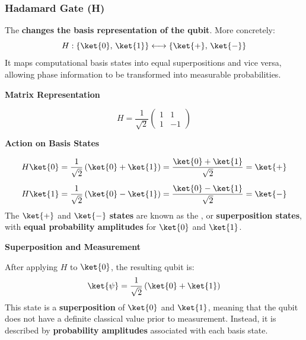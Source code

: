 \subsubsection{Hadamard Gate (H)}\label{subsubsec:hadamard-gate-h}

The  \textbf{changes the basis representation of the qubit}. More concretely:
\begin{equation*}
    H : \left\{ \ket{0}, \, \ket{1}\right\} \longleftrightarrow \left\{ \ket{+}, \, \ket{-}\right\}
\end{equation*}
It maps computational basis states into equal superpositions and vice versa, allowing phase information to be transformed into measurable probabilities.

\highspace
\begin{flushleft}
    \textcolor{Green3}{ \textbf{Matrix Representation}}
\end{flushleft}
\begin{equation}
    H = \dfrac{1}{\sqrt{2}} 
    \begin{pmatrix}
        1 & 1 \\ 1 & -1
    \end{pmatrix}
\end{equation}

\highspace
\begin{flushleft}
    \textcolor{Green3}{ \textbf{Action on Basis States}}
\end{flushleft}
\begin{align}\label{eq:hadamard-action-on-basis-states}
    H \ket{0} &= \dfrac{1}{\sqrt{2}}\left(\ket{0} + \ket{1}\right) = \dfrac{\ket{0} + \ket{1}}{\sqrt{2}} = \ket{+} \\[.5em]
    H \ket{1} &= \dfrac{1}{\sqrt{2}}\left(\ket{0} - \ket{1}\right) = \dfrac{\ket{0} - \ket{1}}{\sqrt{2}} = \ket{-}
\end{align}
The $\ket{+}$ and $\ket{-}$ \textbf{states} are known as the , or \textbf{superposition states}, with \textbf{equal probability amplitudes} for $\ket{0}$ and $\ket{1}$.

\highspace
\begin{flushleft}
    \textcolor{Green3}{ \textbf{Superposition and Measurement}}
\end{flushleft}
After applying $H$ to $\ket{0}$, the resulting qubit is:
\begin{equation*}
    \ket{\psi} = \dfrac{1}{\sqrt{2}}\left(\ket{0} + \ket{1}\right)
\end{equation*}
This state is a \textbf{superposition} of $\ket{0}$ and $\ket{1}$, meaning that the qubit does not have a definite classical value prior to measurement. Instead, it is described by \textbf{probability amplitudes} associated with each basis state.

